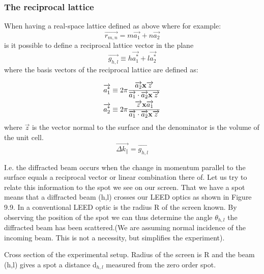 \subsubsection{The reciprocal lattice}

When having a real-space lattice defined as above where for example:
\begin{equation}
\overrightarrow{r_{m,n}} = m\overrightarrow{a_1} + n\overrightarrow{a_2}
\end{equation}
is it possible to define a reciprocal lattice vector in the plane
\begin{equation}
\overrightarrow{g_{h,l}} \equiv h\overrightarrow{a_{1}^{*}} + l\overrightarrow{a_{2}^{*}}
\end{equation} where the basis vectors of the reciprocal lattice are defined as:

\begin{eqnarray}
\overrightarrow{a_{1}^{*}} \equiv 2\pi\frac{\overrightarrow{a_2}{\bf x}\overrightarrow{z}}{\overrightarrow{a_1} \cdot \overrightarrow{a_2} {\bf x} \overrightarrow{z}}\\
\overrightarrow{a_{2}^{*}} \equiv 2\pi \frac{\overrightarrow{z} {\bf x}\overrightarrow{a_1}}{\overrightarrow{a_1} \cdot \overrightarrow{a_2} {\bf x} \overrightarrow{z}}
\end{eqnarray}
where $\overrightarrow{z}$ is the vector normal to the surface and the denominator is the volume of the unit cell. 
 \begin{equation}
 \overrightarrow{\Delta k_{\parallel}}= \overrightarrow{g_{h,l}}
\end{equation}

I.e. the diffracted beam occurs when the change in momentum parallel to the surface equals a reciprocal vector or linear combination there of. Let us try to relate this information to the spot we see on our screen. That we have a spot means that a diffracted beam (h,l) crosses our LEED optics as shown in Figure 9.9.  In a conventional LEED optic is the radius R of the screen known. By observing the position of the spot we can thus determine the angle $\theta_{h,l}$ the diffracted beam has been scattered.(We are assuming normal incidence of the incoming beam. This is not a necessity, but simplifies the experiment).

\vspace*{11cm}

 Cross section of the experimental setup. Radius of the screen is R and the beam (h,l) gives a spot a distance d$_{h,l}$ measured from the zero order spot.
 

